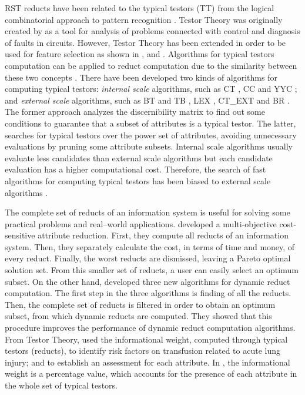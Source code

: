 \documentclass[authoryear,preprint,review,12pt]{elsarticle}
\begin{document}
  RST reducts have been related to the typical testors (TT) from the logical combinatorial approach 
  to pattern recognition \citep{Chikalov2013}. Testor Theory was originally created by \cite{Cheguis55} as a tool
  for analysis of problems connected with control and diagnosis of faults in circuits. 
  However, Testor Theory has been extended in order to be used for feature selection as shown in \citep{Dmitriev1966}, \citep{Martinez01} and \citep{Ruiz08}. Algorithms for typical testors computation can be applied to reduct computation due to the similarity between these two concepts \citep{Lazo15}. There have been developed two kinds of algorithms for computing typical testors: \emph{internal scale} algorithms, such as CT \citep{Bravo83}, CC \citep{Aguila84} and YYC \citep{Alba14}; and \emph{external scale} algorithms, such as BT and TB \citep{Ruiz85}, LEX \citep{Santiesteban03}, CT\_EXT \citep{Sanchez07} and BR \citep{Lias09}. The former approach analyzes the discernibility matrix to find out some conditions to guarantee that a subset of attributes is a typical testor. The latter, searches for typical testors over the power set of attributes, avoiding unnecessary evaluations by pruning some attribute subsets. Internal scale algorithms usually evaluate less candidates than external scale algorithms but each candidate evaluation has a higher computational cost. Therefore, the search of fast algorithms for computing typical testors has been biased to external scale algorithms \citep{Alba14}.
    
  The complete set of reducts of an information system is useful for solving some practical problems and real--world applications. \cite{Xu2013} developed a multi-objective cost-sensitive attribute reduction. First, they compute all reducts of an information system. Then, they separately calculate the cost, in terms of time and money, of every reduct. Finally, the worst reducts are dismissed, leaving a Pareto optimal solution set. From this smaller set of reducts, a user can easily select an optimum subset. On the other hand, \cite{Mukamakuza2014} developed three new algorithms for dynamic reduct computation. 
  The first step in the three algorithms is finding of all the reducts. Then, the complete set of reducts 
  is filtered in order to obtain an optimum subset, from which dynamic reducts are computed. They showed that 
  this procedure improves the performance of dynamic reduct computation algorithms.	
  From Testor Theory, \cite{Torres2014} used the informational weight, computed through typical testors 
  (reducts), to identify risk factors on transfusion related to acute lung injury; and to establish an assessment
  for each attribute.  In \citep{Torres2014}, the informational weight is a percentage value, which accounts 
  for the presence of each attribute in the whole set of typical testors. 
	
\end{document}
